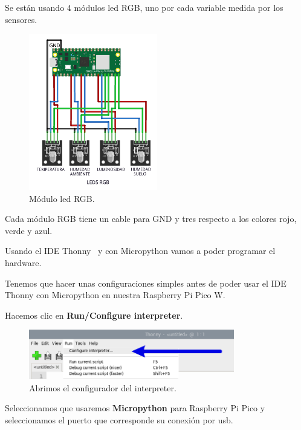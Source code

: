 Se están usando 4 módulos led RGB, uno por cada variable medida por los sensores.

\begin{figure}[h]
	\centering
	\includegraphics[width=0.5\textwidth]{img/diagramas/leds_rgb.png}
	\caption{Módulo led RGB.}
\end{figure}

Cada módulo RGB tiene un cable para GND y tres respecto a los colores rojo, verde y azul.

Usando el IDE Thonny~\cite{misc:Thonny} y con Micropython vamos a poder programar el hardware. 

Tenemos que hacer unas configuraciones simples antes de poder usar el IDE Thonny con Micropython en nuestra Raspberry Pi Pico W.

Hacemos clic en \textbf{Run/Configure interpreter}.

\begin{figure}[h]
	\centering
	\includegraphics[width=0.8\textwidth]{img/desarrollo/thonny_interpreter.png}
	\caption{Abrimos el configurador del interpreter.}
\end{figure}

Seleccionamos que usaremos \textbf{Micropython} para Raspberry Pi Pico y seleccionamos el puerto que corresponde su conexión por usb.

